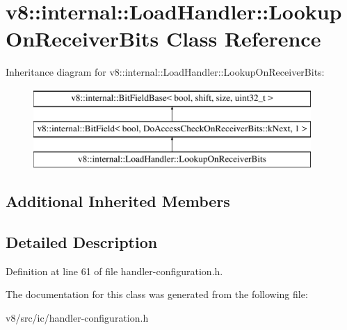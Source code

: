 \hypertarget{classv8_1_1internal_1_1LoadHandler_1_1LookupOnReceiverBits}{}\section{v8\+:\+:internal\+:\+:Load\+Handler\+:\+:Lookup\+On\+Receiver\+Bits Class Reference}
\label{classv8_1_1internal_1_1LoadHandler_1_1LookupOnReceiverBits}
Inheritance diagram for v8\+:\+:internal\+:\+:Load\+Handler\+:\+:Lookup\+On\+Receiver\+Bits\+:\begin{figure}[H]
\begin{center}
\leavevmode
\includegraphics[height=3.000000cm]{classv8_1_1internal_1_1LoadHandler_1_1LookupOnReceiverBits}
\end{center}
\end{figure}
\subsection*{Additional Inherited Members}


\subsection{Detailed Description}


Definition at line 61 of file handler-\/configuration.\+h.



The documentation for this class was generated from the following file\+:\begin{DoxyCompactItemize}
\item 
v8/src/ic/handler-\/configuration.\+h\end{DoxyCompactItemize}
